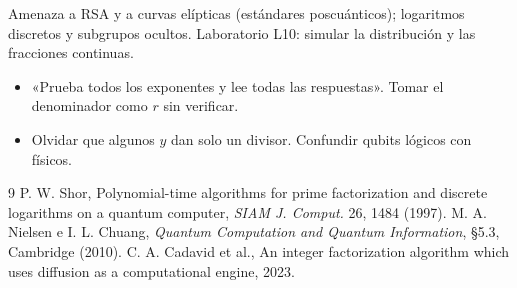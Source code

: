 \documentclass[11pt,a4paper]{article}
\begin{document}
\begin{aplicacion}
Amenaza a RSA y a curvas elípticas (estándares poscuánticos); logaritmos discretos y subgrupos ocultos. Laboratorio L10: simular la distribución y las fracciones continuas.
\end{aplicacion}

\begin{error}
\begin{itemize}[nosep]
\item «Prueba todos los exponentes y lee todas las respuestas». \quad Tomar el denominador como $r$ sin verificar.
\item Olvidar que algunos $y$ dan solo un divisor. \quad Confundir qubits lógicos con físicos.
\end{itemize}
\end{error}

\begin{thebibliography}{9}\small
{} P. W. Shor, Polynomial-time algorithms for prime factorization and discrete logarithms on a quantum computer, \emph{SIAM J. Comput.} 26, 1484 (1997).
 M. A. Nielsen e I. L. Chuang, \emph{Quantum Computation and Quantum Information}, §5.3, Cambridge (2010).
 C. A. Cadavid et al., An integer factorization algorithm which uses diffusion as a computational engine, 2023.
\end{thebibliography}
\end{document}
